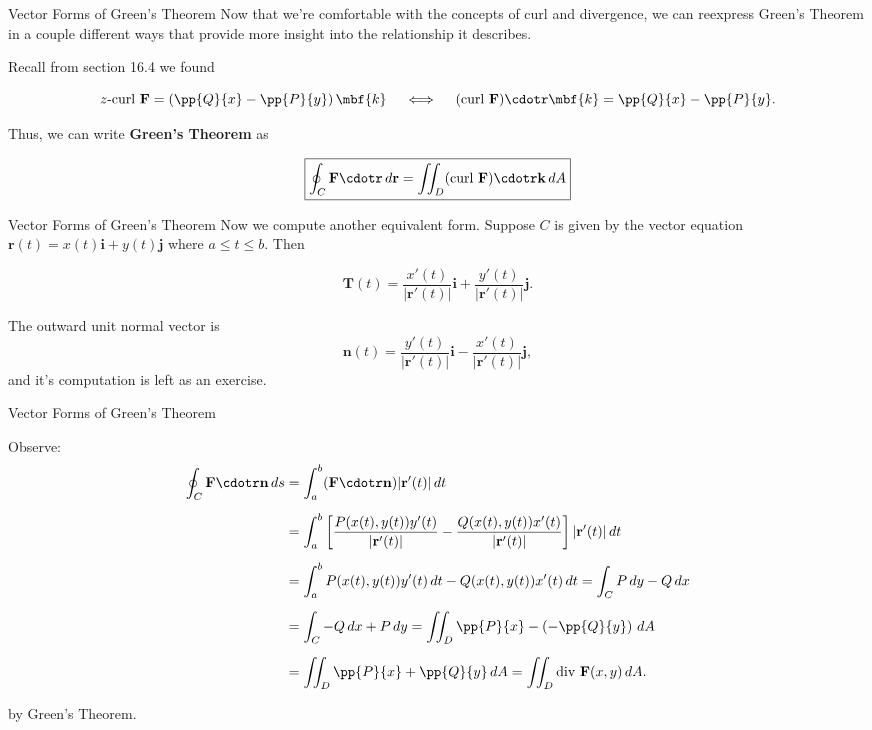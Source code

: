 \documentclass[11pt,english,
handout
]{beamer}
\begin{document}
\begin{frame}[t]{Vector Forms of Green's Theorem}
\small 
Now that we're comfortable with the concepts of curl and divergence, we can reexpress Green's Theorem in a couple different ways that provide more insight into the relationship it describes. \pause 

\lspace
Recall from section 16.4 we found 

\[
z\text{-curl }\mathbf{F}=\left(\pp{Q}{x}-\pp{P}{y}\right)\mbf{k} \quad \iff \quad (\text{curl }\mathbf{F})\cdotr \mbf{k}=\pp{Q}{x}-\pp{P}{y}.
\]\pause

Thus, we can write \textbf{Green's Theorem} as 

\[
\boxed{
\oint_C\mathbf{F}\cdotr\,d\mathbf{r}=\iint_D(\text{curl }\mathbf{F})\cdotr\mathbf{k}\,dA}
\]
\end{frame}












\begin{frame}[t]{Vector Forms of Green's Theorem}
\small 
Now we compute another equivalent form. Suppose $C$ is given by the vector equation $\mathbf{r}(t)=x(t)\mathbf{i}+y(t)\mathbf{j}$ where $a\leq t\leq b$. \pause Then

\[
\mathbf{T}(t)=\frac{x'(t)}{|\mathbf{r}'(t)|}\mathbf{i}+\frac{y'(t)}{|\mathbf{r}'(t)|}\mathbf{j}.
\]\pause

The outward unit normal vector is
\[
\mathbf{n}(t)=\frac{y'(t)}{|\mathbf{r}'(t)|}\mathbf{i}-\frac{x'(t)}{|\mathbf{r}'(t)|}\mathbf{j},
\]
and it's computation is left as an exercise.
\end{frame}







\begin{frame}[t]{Vector Forms of Green's Theorem}
\small 

Observe:
\begin{align*}
\oint_C\mathbf{F}\cdotr\mathbf{n}\,ds&=\int_a^b(\mathbf{F}\cdotr\mathbf{n})|\mathbf{r}'(t)|\,dt\\[2mm]
&=\int_a^b\left[\frac{P(x(t),y(t))y'(t)}{|\mathbf{r}'(t)|}-\frac{Q(x(t),y(t))x'(t)}{|\mathbf{r}'(t)|}\right]|\mathbf{r}'(t)|\,dt\\[2mm]
&=\int_a^bP(x(t),y(t))y'(t)\,dt-Q(x(t),y(t))x'(t)\,dt=\int_CP\,dy-Q\,dx\\[2mm]
&=\int_C-Q\,dx+P\,dy=\iint_D\pp{P}{x}-\left(-\pp{Q}{y}\right)\,dA\\[2mm]
&=\iint_D\pp{P}{x}+\pp{Q}{y}\,dA=\iint_D\text{div }\mathbf{F}(x,y)\,dA.
\end{align*}

by Green's Theorem.
\end{frame}
\end{document}
